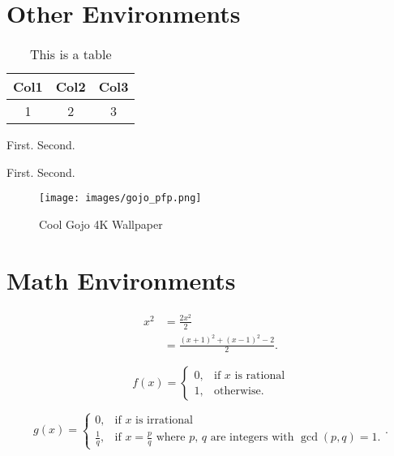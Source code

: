 \documentclass[12pt]{scrartcl}
\begin{document}
\newpage

\section{Other Environments}


\begin{table}[htbp]
\label{tab:1}
\centering
\begin{tabular}{||c c c||}

\hline
Col1 & Col2 & Col3 \\ [0.5ex]
\hline\hline

1 & 2 & 3 \\
\hline

\end{tabular}
\caption{This is a table}
\end{table}

\begin{enumerate}[(a)]
  \ii First.
  \ii Second.
\end{enumerate}

\begin{itemize}
  \ii First.
  \ii Second.
\end{itemize}

\begin{figure}[htbp]
    \centering
    \texttt{[image: images/gojo\_pfp.png]}
    \caption{Cool Gojo 4K Wallpaper}
    \label{fig:gojo1}
\end{figure}

\newpage

\section{Math Environments}


\begin{align*}
  x^2
  &= \frac{2x^2}{2}\\
  &= \frac{(x+1)^2+(x-1)^2 - 2}{2}
.\end{align*}

\[
  f(x)=\begin{cases}
    0, & \text{if } x \text{ is rational} \\
    1, & \text{otherwise}
  .\end{cases}
\]

\[
  g(x)=\begin{cases}
    0, & \text{if } x \text{ is irrational}\\
    \frac{1}{q}, & \text{if } x=\frac{p}{q}
    \text{ where $p$, $q$ are integers with $\gcd(p,q)=1$}.
  \end{cases}
.\]
\end{document}
